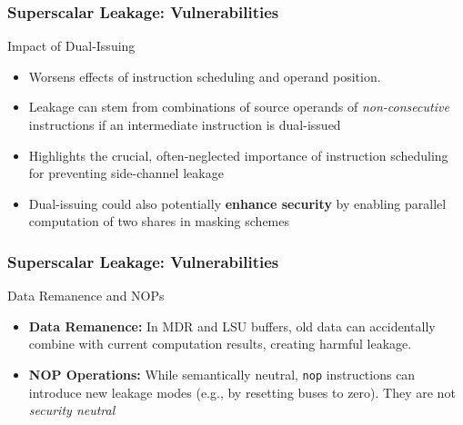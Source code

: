 \begin{frame}
    \frametitle{Superscalar Leakage: Vulnerabilities}
    \begin{block}{Impact of Dual-Issuing}
        \begin{itemize}
            \item Worsens effects of instruction scheduling and operand position.
            \item Leakage can stem from combinations of source operands of \textit{non-consecutive} instructions if an intermediate instruction is dual-issued
            \item Highlights the crucial, often-neglected importance of instruction scheduling for preventing side-channel leakage
            \item Dual-issuing could also potentially \textbf{enhance security} by enabling parallel computation of two shares in masking schemes
        \end{itemize}
    \end{block}
\end{frame}
\begin{frame}
\frametitle{Superscalar Leakage: Vulnerabilities}
    \begin{block}{Data Remanence and NOPs}
        \begin{itemize}
            \item \textbf{Data Remanence:} In MDR and LSU buffers, old data can accidentally combine with current computation results, creating harmful leakage.
            \item \textbf{NOP Operations:} While semantically neutral, \texttt{nop} instructions can introduce new leakage modes (e.g., by resetting buses to zero). They are not \textit{security neutral}
        \end{itemize}
    \end{block}
\end{frame}